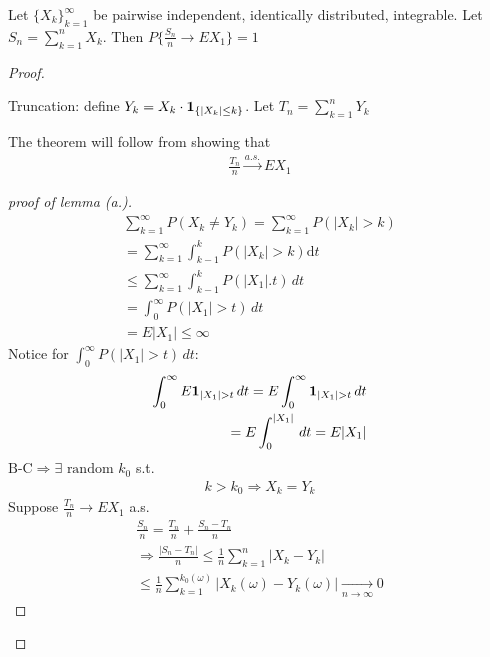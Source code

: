 \documentclass[11pt]{article}
\begin{document}
\begin{theorem}[SLLN]
    Let $\{ X_k \}_{k=1}^{\infty}$ be pairwise independent, identically distributed, integrable.
    Let $S_n = \sum_{k=1}^{n}X_k$. Then $P\{ \frac{S_n}{n} \longrightarrow EX_1 \} = 1$
\end{theorem}
\begin{proof}
    \,

    Truncation: define $Y_k = X_k \cdot \bm{1}_{\{ |X_k| \le k \}}$. Let $T_n = \sum_{k=1}^{n} Y_k$
    \begin{lemma}[(a)]
        The theorem will follow from showing that 
        \begin{align*}
            \frac{T_n}{n} \overset{a.s.}{\longrightarrow}EX_1
        \end{align*}
    \end{lemma}
    \begin{proof}[proof of lemma (a.)]
        \begin{align*}
            \sum_{k=1}^{\infty}P(X_k \neq Y_k) = \sum_{k=1}^{\infty}P(|X_k|>k)\\
            = \sum_{k=1}^{\infty} \int_{k-1}^{k} P(|X_k| > k) \mathrm{d}t \\
            \le \sum_{k=1}^{\infty} \int_{k-1}^{k}P(|X_1| . t)\, dt \\
            = \int_{0}^{\infty}P(|X_1| > t)\,dt \\
            = E|X_1| \le \infty
        \end{align*}
        Notice for $\int_{0}^{\infty}P(|X_1| > t)\,dt$:
        \begin{align*}
            \int_{0}^{\infty}E\bm{1}_{|X_1| > t}\,dt = E\int_{0}^{\infty}\bm{1}_{|X_1| > t}\,dt \\
            = E \int_{0}^{|X_1|}\,dt = E|X_1|
        \end{align*}
        $\text{B-C} \Longrightarrow \exists \text{ random }k_0$ s.t.
        \begin{align*}
            k > k_0 \Longrightarrow X_k = Y_k
        \end{align*}
        Suppose $\frac{T_n}{n} \longrightarrow EX_1$ a.s.
        \begin{align*}
            \frac{S_n}{n} = \frac{T_n}{n} + \frac{S_n - T_n}{n}\\
            \Longrightarrow \frac{|S_n - T_n|}{n} \le \frac{1}{n} \sum_{k=1}^{n}|X_k-Y_k|\\
            \le \frac{1}{n}\sum_{k=1}^{k_0(\omega)} |X_k(\omega)-Y_k(\omega)|
            \underset{n \longrightarrow \infty}{\longrightarrow} 0
        \end{align*}
    \end{proof}
\end{proof}
\end{document}
